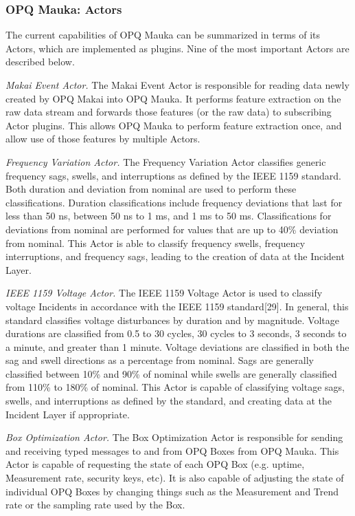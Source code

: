 \subsubsection{OPQ Mauka: Actors}

The current capabilities of OPQ Mauka can be summarized in terms of its Actors, which are implemented as plugins. Nine of the most important Actors are described below.

{\em Makai Event Actor.} The Makai Event Actor is responsible for reading data newly created by OPQ Makai into OPQ Mauka. It performs feature extraction on the raw data stream and forwards those features (or the raw data) to subscribing Actor plugins. This allows OPQ Mauka to perform feature extraction once, and allow use of those features by multiple Actors.

{\em Frequency Variation Actor.} The Frequency Variation Actor classifies generic frequency sags, swells, and interruptions as defined by the IEEE 1159 standard. Both duration and deviation from nominal are used to perform these classifications. Duration classifications include frequency deviations that last for less than 50 ns, between 50 ns to 1 ms, and 1 ms to 50 ms. Classifications for deviations from nominal are performed for values that are up to 40\% deviation from nominal. This Actor is able to classify frequency swells, frequency interruptions, and frequency sags, leading to the creation of data at the Incident Layer.

{\em IEEE 1159 Voltage Actor.} The IEEE 1159 Voltage Actor is used to classify voltage Incidents in accordance with the IEEE 1159 standard[29]. In general, this standard classifies voltage disturbances by duration and by magnitude. Voltage durations are classified from 0.5 to 30 cycles, 30 cycles to 3 seconds, 3 seconds to a minute, and greater than 1 minute. Voltage deviations are classified in both the sag and swell directions as a percentage from nominal. Sags are generally classified between 10\% and 90\% of nominal while swells are generally classified from 110\% to 180\% of nominal. This Actor is capable of classifying voltage sags, swells, and interruptions as defined by the standard, and creating data at the Incident Layer if appropriate.

{\em Box Optimization Actor.} The Box Optimization Actor is responsible for sending and receiving typed messages to and from OPQ Boxes from OPQ Mauka. This Actor is capable of requesting the state of each OPQ Box (e.g. uptime, Measurement rate, security keys, etc). It is also capable of adjusting the state of individual OPQ Boxes by changing things such as the Measurement and Trend rate or the sampling rate used by the Box.


